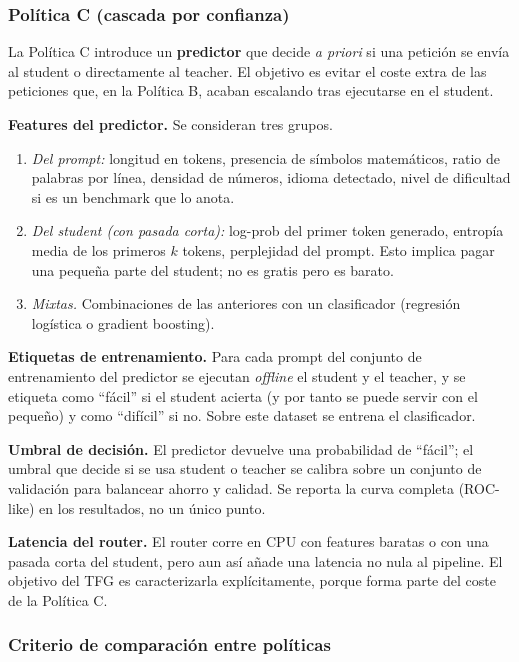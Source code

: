 \subsubsection{Política C (cascada por confianza)}

La Política C introduce un \textbf{predictor} que decide \textit{a priori} si una petición se envía al student o directamente al teacher. El objetivo es evitar el coste extra de las peticiones que, en la Política B, acaban escalando tras ejecutarse en el student.

\textbf{Features del predictor.} Se consideran tres grupos.
\begin{enumerate}[nosep,leftmargin=*]
\item \textit{Del prompt:} longitud en tokens, presencia de símbolos matemáticos, ratio de palabras por línea, densidad de números, idioma detectado, nivel de dificultad si es un benchmark que lo anota.
\item \textit{Del student (con pasada corta):} log-prob del primer token generado, entropía media de los primeros $k$ tokens, perplejidad del prompt. Esto implica pagar una pequeña parte del student; no es gratis pero es barato.
\item \textit{Mixtas.} Combinaciones de las anteriores con un clasificador (regresión logística o gradient boosting).
\end{enumerate}

\textbf{Etiquetas de entrenamiento.} Para cada prompt del conjunto de entrenamiento del predictor se ejecutan \textit{offline} el student y el teacher, y se etiqueta como ``fácil'' si el student acierta (y por tanto se puede servir con el pequeño) y como ``difícil'' si no. Sobre este dataset se entrena el clasificador.

\textbf{Umbral de decisión.} El predictor devuelve una probabilidad de ``fácil''; el umbral que decide si se usa student o teacher se calibra sobre un conjunto de validación para balancear ahorro y calidad. Se reporta la curva completa (ROC-like) en los resultados, no un único punto.

\textbf{Latencia del router.} El router corre en CPU con features baratas o con una pasada corta del student, pero aun así añade una latencia no nula al pipeline. El objetivo del TFG es caracterizarla explícitamente, porque forma parte del coste de la Política C.

\subsubsection{Criterio de comparación entre políticas}

